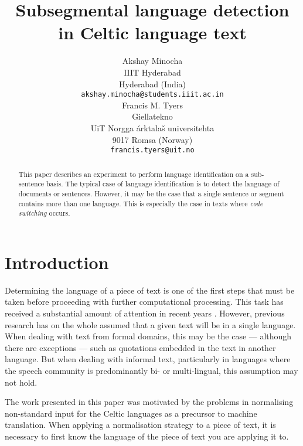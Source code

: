 \documentclass[11pt]{article}
\title{Subsegmental language detection in Celtic language text}
\author{}
\author{Akshay Minocha \\
  IIIT Hyderabad  \\
  Hyderabad (India) \\
  {\tt akshay.minocha@students.iiit.ac.in} \\\And
  Francis M. Tyers \\
  Giellatekno \\ %
  UiT Norgga \'arktala\v{s} universitehta  \\
  9017 Romsa (Norway) \\
  {\tt francis.tyers@uit.no} \\}
\date{}
\begin{document}
\maketitle
\begin{abstract}
  This paper describes an experiment to perform language identification on a sub-sentence basis. The typical
  case of language identification is to detect the language of documents or sentences. However, it may be the 
  case that a single sentence or segment contains more than one language. This is especially the case in texts
  where \emph{code switching} occurs. 

\end{abstract}

\section{Introduction}
\vspace{-0.132cm}
\label{intro}
Determining the language of a piece of text is one of the first steps that must be taken
before proceeding with further computational processing. This task has received a substantial amount of
attention in recent years \cite{cavnar1994n,lui2012langid}. However, previous research has on the whole assumed
that a given text will be in a single language. When dealing with text from formal domains,
this may be the case --- although there are exceptions --- such as quotations embedded in
the text in another language. But when dealing with informal text, particularly in languages
where the speech community is predominantly bi- or multi-lingual, this assumption may not hold.

The work presented in this paper was motivated by the problems in normalising non-standard input
for the Celtic languages as a precursor to machine translation. When applying a normalisation 
strategy to a piece of text, it is necessary to first know the language of the piece of text you are applying it to.
\end{document}
